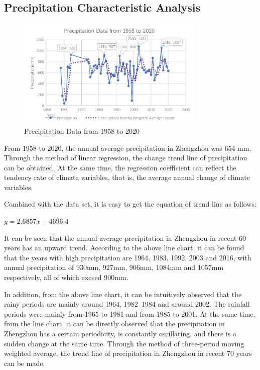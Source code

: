 \documentclass{swmcmthesis}
\begin{document}
\subsection{Precipitation Characteristic Analysis}
\begin{figure}[h!t]
    \centering
    \includegraphics[width=0.8\textwidth]{precipitation_figure.jpg}
    \caption{Precipitation Data from 1958 to 2020}
\end{figure}
\par
From 1958 to 2020, the annual average precipitation in Zhengzhou was 654 mm. Through the method of linear regression, the change trend line of precipitation can be obtained. At the same time, the regression coefficient can reflect the tendency rate of climate variables, that is, the average annual change of climate variables.
\par
Combined with the data set, it is easy to get the equation of trend line as follows:
\par
\begin{center}
    $ y = 2.6857x - 4696.4 $
\end{center}
\par
It can be seen that the annual average precipitation in Zhengzhou in recent 60 years has an upward trend. According to the above line chart, it can be found that the years with high precipitation are 1964, 1983, 1992, 2003 and 2016, with annual precipitation of 930mm, 927mm, 906mm, 1084mm and 1057mm respectively, all of which exceed 900mm.
\par
In addition, from the above line chart, it can be intuitively observed that the rainy periods are mainly around 1964, 1982~1984 and around 2002. The rainfall periods were mainly from 1965 to 1981 and from 1985 to 2001. At the same time, from the line chart, it can be directly observed that the precipitation in Zhengzhou has a certain periodicity, is constantly oscillating, and there is a sudden change at the same time. Through the method of three-period moving weighted average, the trend line of precipitation in Zhengzhou in recent 70 years can be made.
\par
\end{document}
